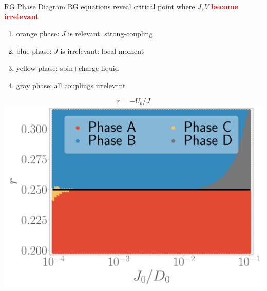 \documentclass[11pt,aspectratio=169]{beamer}
\newcommand{\focus}[1]{\textcolor{red}{\bf{#1}}}
\begin{document}
\begin{frame}{RG Phase Diagram}
RG equations reveal critical point where \(J,V\) \focus{become irrelevant}\\[10pt]

\hspace*{-20pt}
\begin{minipage}{0.52\textwidth}
\begin{enumerate}
	\item orange phase: \(J\) is relevant: strong-coupling\\[20pt]
	\item blue phase: \(J\) is irrelevant: local moment\\[20pt]
	\item yellow phase: spin+charge liquid\\[20pt]
	\item gray phase: all couplings irrelevant
\end{enumerate}
\end{minipage}
\begin{minipage}{0.5\textwidth}
	\[r = -U_b/J\]
	\includegraphics[width=\textwidth]{phase-map-MIT.pdf}
\end{minipage}

\end{frame}
\end{document}
